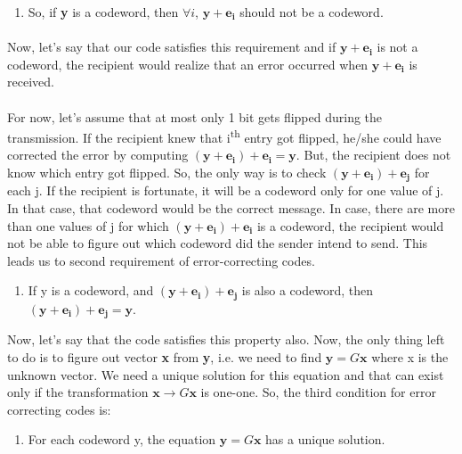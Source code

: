 \documentclass[11pt,a4paper]{article}
\begin{document}
\begin{enumerate}
    \item So, if \textbf{y} is a codeword, then $\forall i$, $\mathbf{y} + \mathbf{e_{i}}$ should not be a codeword.
\end{enumerate}


\paragraph{}
Now, let's say that our code satisfies this requirement and if $\mathbf{y} + \mathbf{e_{i}}$ is not a codeword, the recipient would realize that an error occurred when $\mathbf{y} + \mathbf{e_{i}}$ is received.

\paragraph{}
For now, let's assume that at most only 1 bit gets flipped during the transmission. If the recipient knew that i\textsuperscript{th} entry got flipped, he/she could have corrected the error by computing $(\mathbf{y} + \mathbf{e_i}) + \mathbf{e_i} = \mathbf{y}$. But, the recipient does not know which entry got flipped. So, the only way is to check $(\mathbf{y} + \mathbf{e_i}) + \mathbf{e_j}$ for each j. If the recipient is fortunate, it will be a codeword only for one value of j. In that case, that codeword would be the correct message. In case, there are more than one values of j for which $(\mathbf{y} + \mathbf{e_i}) + \mathbf{e_i}$ is a codeword, the recipient would not be able to figure out which codeword did the sender intend to send. This leads us to second requirement of error-correcting codes. 

\begin{enumerate}[resume]
    \item If y is a codeword, and $(\mathbf{y} + \mathbf{e_i}) + \mathbf{e_j}$ is also a codeword, then $(\mathbf{y} + \mathbf{e_i}) + \mathbf{e_j} = \mathbf{y}$.
\end{enumerate}

Now, let's say that the code satisfies this property also. Now, the only thing left to do is to figure out vector \textbf{x} from \textbf{y}, i.e. we need to find $\mathbf{y} = G\mathbf{x}$ where x is the unknown vector. We need a unique solution for this equation and that can exist only if the transformation $\mathbf{x} \to G\mathbf{x}$ is one-one. So, the third condition for error correcting codes is: 

\begin{enumerate}[resume]
    \item For each codeword y, the equation $\mathbf{y} = G\mathbf{x}$ has a unique solution.
\end{enumerate}
\end{document}
